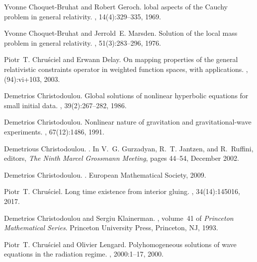 \documentclass[reqno,11pt,letterpaper]{amsart}
\numberwithin{equation}{section}
\numberwithin{figure}{section}
\theoremstyle{definition}
\theoremstyle{remark}
\begin{document}
\begin{thebibliography}{GCHMG05}
Yvonne Choquet-Bruhat and Robert Geroch.
lobal aspects of the {C}auchy problem in general relativity.
, 14(4):329--335, 1969.

Yvonne Choquet-Bruhat and Jerrold~E. Marsden.
\newblock Solution of the local mass problem in general relativity.
, 51(3):283--296, 1976.

Piotr~T. Chru{\'s}ciel and Erwann Delay.
\newblock On mapping properties of the general relativistic constraints
  operator in weighted function spaces, with applications.
, (94):vi+103, 2003.

Demetrios Christodoulou.
\newblock Global solutions of nonlinear hyperbolic equations for small initial
  data.
, 39(2):267--282,
  1986.

Demetrios Christodoulou.
\newblock Nonlinear nature of gravitation and gravitational-wave experiments.
, 67(12):1486, 1991.

Demetrious Christodoulou.
.
\newblock In V.~G. {Gurzadyan}, R.~T. {Jantzen}, and R.~{Ruffini}, editors,
  {\em The Ninth Marcel Grossmann Meeting}, pages 44--54, December 2002.

Demetrios Christodoulou.
.
\newblock European Mathematical Society, 2009.

Piotr~T. Chru{\'s}ciel.
\newblock Long time existence from interior gluing.
, 34(14):145016, 2017.

Demetrios Christodoulou and Sergiu Klainerman.
,
  volume~41 of {\em Princeton Mathematical Series}.
\newblock Princeton University Press, Princeton, NJ, 1993.

Piotr~T. Chru{\'s}ciel and Olivier Lengard.
\newblock Polyhomogeneous solutions of wave equations in the radiation regime.
,
  2000:1--17, 2000.


\end{thebibliography}
\end{document}

